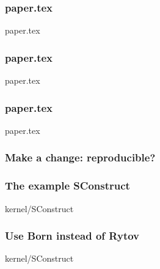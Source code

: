 \begin{frame} \frametitle{paper.tex}

\normalsize 

		{paper.tex}
		
\end{frame}
\cwpnote{}

\begin{frame} \frametitle{paper.tex}

\normalsize 

		{paper.tex}
		
\end{frame}
\cwpnote{}

\begin{frame} \frametitle{paper.tex}

\normalsize 

		{paper.tex}
		
\end{frame}
\cwpnote{}

\begin{frame} 

\frametitle{Make a change: reproducible?}


\end{frame}
\cwpnote{}

\begin{frame} \frametitle{The example SConstruct}

\normalsize 

		{kernel/SConstruct}
		
\end{frame}
\cwpnote{}

\begin{frame} \frametitle{Use Born instead of Rytov}

\normalsize 

		{kernel/SConstruct}

		
\end{frame}
\cwpnote{}

